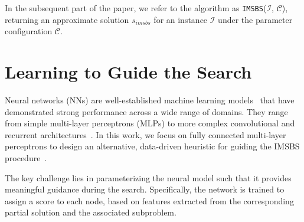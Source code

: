 \documentclass[runningheads]{llncs}
\begin{document}
	 
	 
	
	In the subsequent part of the paper, we refer to the algorithm as \texttt{IMSBS}($\mathcal{I}$, $\mathcal{C}$),  %
	returning an approximate solution $s_{imsbs}$ for an instance $\mathcal{I}$ under the parameter configuration $\mathcal{C}$.  %
 
   
\section{Learning to Guide the Search} \label{sec:ffnn_guidance}

Neural networks (NNs) are well-established machine learning models~\cite{gurney2018introduction,bishop1994neural} that have demonstrated strong performance across a wide range of domains. They range from simple multi-layer perceptrons (MLPs) to more complex convolutional and recurrent architectures~\cite{mienye2024recurrent}. In this work, we focus on fully connected multi-layer perceptrons to design an alternative, data-driven heuristic for guiding the IMSBS procedure~\cite{djukanovic2026_eurocast}. 

The key challenge lies in parameterizing the neural model such that it provides meaningful guidance during the search. Specifically, the network is trained to assign a score to each node, based on features extracted from the corresponding partial solution and the associated subproblem.
\end{document}
